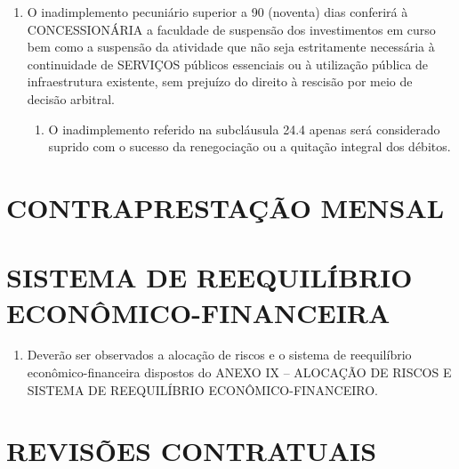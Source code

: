 \documentclass[a4paper,11pt]{report} %
\begin{document}
\begin{enumerate}
\item \label{itm:PKGQ} O inadimplemento pecuniário superior a 90 (noventa) dias conferirá à CONCESSIONÁRIA a faculdade de suspensão dos investimentos em curso bem como a suspensão da atividade que não seja estritamente necessária à continuidade de SERVIÇOS públicos essenciais ou à utilização pública de infraestrutura existente, sem prejuízo do direito à rescisão por meio de decisão arbitral.

\begin{enumerate}[label*=\arabic*.]
\item \label{itm:AAR9} O inadimplemento referido na subcláusula 24.4 apenas será considerado suprido com o sucesso da renegociação ou a quitação integral dos débitos.
\end{enumerate}
\end{enumerate}

\section{CONTRAPRESTAÇÃO MENSAL}
\label{sec:H7QB}

\section{SISTEMA DE REEQUILÍBRIO ECONÔMICO-FINANCEIRA}
\label{sec:XH22}

\begin{enumerate}
\item \label{itm:Z768} Deverão ser observados a alocação de riscos e o sistema de reequilíbrio econômico-financeira dispostos do ANEXO IX – ALOCAÇÃO DE RISCOS E SISTEMA DE REEQUILÍBRIO ECONÔMICO-FINANCEIRO.
\end{enumerate}

\section{REVISÕES CONTRATUAIS}
\label{sec:ZHJP}
\end{document}
